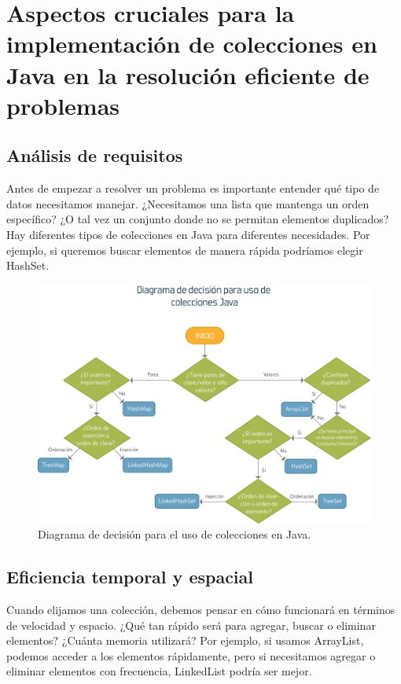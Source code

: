 \documentclass[a4paper,12pt]{article}
\begin{document}
\section{Aspectos cruciales para la implementación de colecciones en Java en la resolución eficiente de problemas}

\subsection{Análisis de requisitos}

Antes de empezar a resolver un problema es importante entender qué tipo de datos necesitamos manejar. ¿Necesitamos una lista que mantenga un orden específico? ¿O tal vez un conjunto donde no se permitan elementos duplicados? Hay diferentes tipos de colecciones en Java para diferentes necesidades. Por ejemplo, si queremos buscar elementos de manera rápida podríamos elegir HashSet.

\begin{figure}[ht]
    \centering
    \includegraphics[width=.9\textwidth]{media/diagrama_decision_uso_de_colecciones.png}
    \caption{Diagrama de decisión para el uso de colecciones en Java. \cite{amor-2020}}
    \label{fig:diagrama_decision_colecciones}
\end{figure}

\subsection{Eficiencia temporal y espacial}

Cuando elijamos una colección, debemos pensar en cómo funcionará en términos de velocidad y espacio. ¿Qué tan rápido será para agregar, buscar o eliminar elementos? ¿Cuánta memoria utilizará? Por ejemplo, si usamos ArrayList, podemos acceder a los elementos rápidamente, pero si necesitamos agregar o eliminar elementos con frecuencia, LinkedList podría ser mejor.
\end{document}
